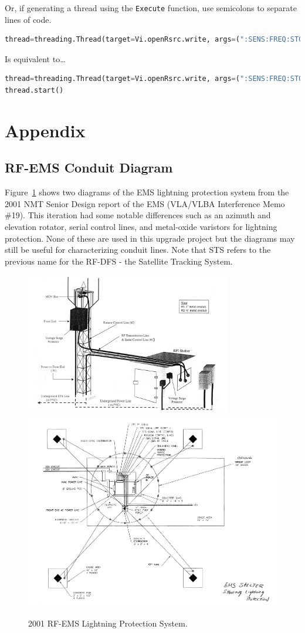 \documentclass[titlepage]{article}
\begin{document}
Or, if generating a thread using the \verb|Execute| function, use semicolons to separate lines of code.
\begin{lstlisting}[language=Python]
thread=threading.Thread(target=Vi.openRsrc.write, args=(":SENS:FREQ:STOP 10e9",), daemon=True);thread.start()
\end{lstlisting}
Is equivalent to\dots
\begin{lstlisting}[language=Python]
thread=threading.Thread(target=Vi.openRsrc.write, args=(":SENS:FREQ:STOP 10e9",), daemon=True)
thread.start()
\end{lstlisting}  

\section{Appendix}
\subsection{RF-EMS Conduit Diagram}
Figure~\ref{fig:oldems} shows two diagrams of the EMS lightning protection system from the 2001 NMT Senior Design report of the EMS (VLA/VLBA Interference Memo \#19). This iteration had some notable differences such as an azimuth and elevation rotator, serial control lines, and metal-oxide varistors for lightning protection. None of these are used in this upgrade project but the diagrams may still be useful for characterizing conduit lines. Note that STS refers to the previous name for the RF-DFS - the Satellite Tracking System.
\begin{figure}[!h]
  \begin{center}
    \includegraphics[width=0.8\textwidth]{images/oldems.png}
    \includegraphics[width=\textwidth]{images/oldems2.png}
  \end{center}
  \caption{2001 RF-EMS Lightning Protection System.}\label{fig:oldems}
\end{figure}
\end{document}
